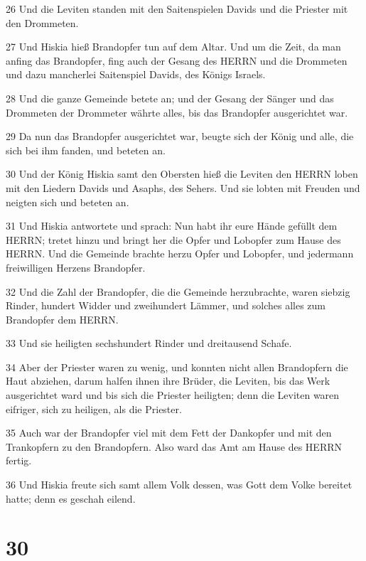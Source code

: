 \par 26 Und die Leviten standen mit den Saitenspielen Davids und die Priester mit den Drommeten.
\par 27 Und Hiskia hieß Brandopfer tun auf dem Altar. Und um die Zeit, da man anfing das Brandopfer, fing auch der Gesang des HERRN und die Drommeten und dazu mancherlei Saitenspiel Davids, des Königs Israels.
\par 28 Und die ganze Gemeinde betete an; und der Gesang der Sänger und das Drommeten der Drommeter währte alles, bis das Brandopfer ausgerichtet war.
\par 29 Da nun das Brandopfer ausgerichtet war, beugte sich der König und alle, die sich bei ihm fanden, und beteten an.
\par 30 Und der König Hiskia samt den Obersten hieß die Leviten den HERRN loben mit den Liedern Davids und Asaphs, des Sehers. Und sie lobten mit Freuden und neigten sich und beteten an.
\par 31 Und Hiskia antwortete und sprach: Nun habt ihr eure Hände gefüllt dem HERRN; tretet hinzu und bringt her die Opfer und Lobopfer zum Hause des HERRN. Und die Gemeinde brachte herzu Opfer und Lobopfer, und jedermann freiwilligen Herzens Brandopfer.
\par 32 Und die Zahl der Brandopfer, die die Gemeinde herzubrachte, waren siebzig Rinder, hundert Widder und zweihundert Lämmer, und solches alles zum Brandopfer dem HERRN.
\par 33 Und sie heiligten sechshundert Rinder und dreitausend Schafe.
\par 34 Aber der Priester waren zu wenig, und konnten nicht allen Brandopfern die Haut abziehen, darum halfen ihnen ihre Brüder, die Leviten, bis das Werk ausgerichtet ward und bis sich die Priester heiligten; denn die Leviten waren eifriger, sich zu heiligen, als die Priester.
\par 35 Auch war der Brandopfer viel mit dem Fett der Dankopfer und mit den Trankopfern zu den Brandopfern. Also ward das Amt am Hause des HERRN fertig.
\par 36 Und Hiskia freute sich samt allem Volk dessen, was Gott dem Volke bereitet hatte; denn es geschah eilend.

\chapter{30}

